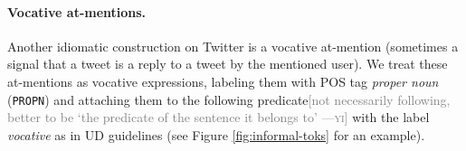 \documentclass[11pt,a4paper]{article}
\newcommand{\yjcomment}[1]{\textcolor{orange}{[$_\mathrm{L}^\mathrm{Y}$#1]}}
\newcommand{\yicomment}[1]{\textcolor{gray}{[#1 ---\textsc{yi}]}}
\begin{document}

\paragraph{Vocative at-mentions.}  Another idiomatic construction on
Twitter is a vocative at-mention (sometimes a
signal that a tweet is a reply to a tweet by the mentioned user). %
We
treat these at-mentions as vocative expressions, labeling them with
POS tag
\emph{proper noun} (\texttt{PROPN}) and attaching them to the
following predicate\yicomment{not necessarily following, better to be `the predicate of the sentence it belongs to'} with the label \emph{vocative} as in UD guidelines (see Figure \ref{fig:informal-toks} for an example).
\end{document}
